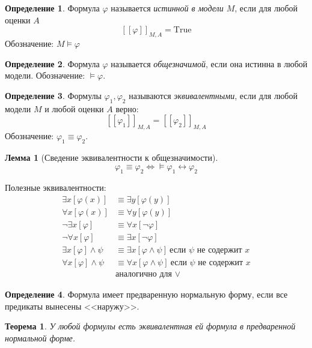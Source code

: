 \documentclass[12pt]{article}
\let\eq\equiv
\let\n\neg
\theoremstyle{definition}
\newtheorem{definition}{Определение}[section]
\theoremstyle{plain}
\newtheorem{theorem}{Теорема}[section]
\newtheorem{lemma}{Лемма}[section]
\theoremstyle{remark}
\begin{document}
\begin{definition}
  Формула $\varphi$ называется \textit{истинной в модели $M$}, если
  для любой оценки $A$
  \[
    [[\varphi]]_{M,A} = \mathrm{True}
  \]
  Обозначение: $M \models \varphi$
\end{definition}

\begin{definition}
  Формула $\varphi$ называется \textit{общезначимой}, если она
  истинна в любой модели. Обозначение: $\models \varphi$.
\end{definition}

\begin{definition}
  Формулы $\varphi_1, \varphi_2$ называются \textit{эквивалентными},
  если для любой модели $M$ и любой оценки $A$ верно:
  \[
    [[\varphi_1]]_{M,A} = [[\varphi_2]]_{M,A}
  \]
  Обозначение: $\varphi_1 \eq \varphi_2$.
\end{definition}

\begin{lemma}[Сведение эквивалентности к общезначимости]
  \[
    \varphi_1 \eq \varphi_2 \iff \models \varphi_1 \leftrightarrow \varphi_2
  \]
\end{lemma}

Полезные эквивалентности:
\begin{align*}
  \exists x[\varphi(x)] &\eq \exists y [\varphi(y)]\\
  \forall x [\varphi(x)] &\eq \forall y [\varphi(y)]\\
  \n \exists x [\varphi] &\eq \forall x [\n \varphi]\\
  \n \forall x [\varphi] &\eq \exists x [\n \varphi]\\
  \exists x [\varphi] \land \psi &\eq \exists x [\varphi \land
  \psi]\ \text{если $\psi$ не содержит $x$}\\
  \forall x [\varphi] \land \psi &\eq \forall x [\varphi \land
  \psi]\ \text{если $\psi$ не содержит $x$}\\
  &\text{аналогично для $\lor$}
\end{align*}

\begin{definition}
  Формула имеет предваренную нормальную форму, если все предикаты
  вынесены <<наружу>>.
\end{definition}

\begin{theorem}
  У любой формулы есть эквивалентная ей формула в предваренной нормальной форме.
\end{theorem}
\end{document}
